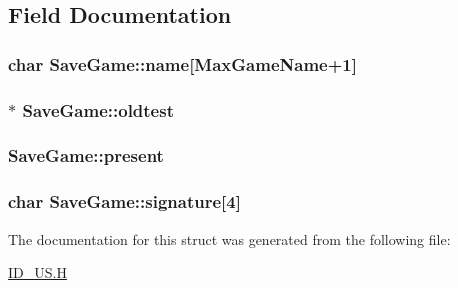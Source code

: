 \subsection{Field Documentation}
\hypertarget{structSaveGame_ad9dd2485c88694662ccf86033584b33d}{
\subsubsection[{name}]{\setlength{\rightskip}{0pt plus 5cm}char {\bf SaveGame::name}\mbox{[}MaxGameName+1\mbox{]}}}
\label{structSaveGame_ad9dd2485c88694662ccf86033584b33d}
\hypertarget{structSaveGame_a0636236d85a2dca8ce19eb253e632063}{
\subsubsection[{oldtest}]{$\ast$ {\bf SaveGame::oldtest}}}
\label{structSaveGame_a0636236d85a2dca8ce19eb253e632063}
\hypertarget{structSaveGame_a40833a12b00cb2d309de1ea949b43f71}{
\subsubsection[{present}]{ {\bf SaveGame::present}}}
\label{structSaveGame_a40833a12b00cb2d309de1ea949b43f71}
\hypertarget{structSaveGame_a60a82730e9f8848f34380840759fe193}{
\subsubsection[{signature}]{\setlength{\rightskip}{0pt plus 5cm}char {\bf SaveGame::signature}\mbox{[}4\mbox{]}}}
\label{structSaveGame_a60a82730e9f8848f34380840759fe193}


The documentation for this struct was generated from the following file:\begin{DoxyCompactItemize}
\item 
\hyperlink{ID__US_8H}{ID\_\-US.H}\end{DoxyCompactItemize}
